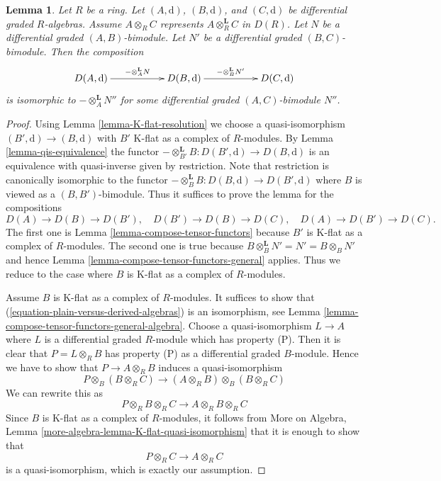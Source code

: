 \documentclass[10pt,a4paper]{amsart}
\theoremstyle{plain}
\newtheorem{lemma}[subsection]{Lemma}
\theoremstyle{definition}
\theoremstyle{remark}
\numberwithin{equation}{subsection}
\begin{document}
\begin{lemma}
\label{lemma-compose-tensor-functors-tor}
Let $R$ be a ring. Let $(A, \text{d})$, $(B, \text{d})$, and
$(C, \text{d})$ be differential graded $R$-algebras. Assume
$A \otimes_R C$ represents $A \otimes^\mathbf{L}_R C$ in $D(R)$.
Let $N$ be a differential graded $(A, B)$-bimodule.
Let $N'$ be a differential graded $(B, C)$-bimodule.
Then the composition
$$
\xymatrix{
D(A, \text{d}) \ar[rr]^{- \otimes_A^\mathbf{L} N} & &
D(B, \text{d}) \ar[rr]^{- \otimes_B^\mathbf{L} N'} & &
D(C, \text{d})
}
$$
is isomorphic to $- \otimes_A^\mathbf{L} N''$ for some differential graded
$(A, C)$-bimodule $N''$.
\end{lemma}

\begin{proof}
Using Lemma \ref{lemma-K-flat-resolution}
we choose a quasi-isomorphism $(B', \text{d}) \to (B, \text{d})$
with $B'$ K-flat as a complex of $R$-modules.
By Lemma \ref{lemma-qis-equivalence}
the functor $-\otimes^\mathbf{L}_{B'} B : D(B', \text{d}) \to D(B, \text{d})$
is an equivalence with quasi-inverse given by restriction.
Note that restriction is canonically isomorphic to the functor
$- \otimes^\mathbf{L}_B B : D(B, \text{d}) \to D(B', \text{d})$
where $B$ is viewed as a $(B, B')$-bimodule.
Thus it suffices to prove the lemma for the compositions
$$
D(A) \to D(B) \to D(B'),\quad
D(B') \to D(B) \to D(C),\quad
D(A) \to D(B') \to D(C).
$$
The first one is Lemma \ref{lemma-compose-tensor-functors}
because $B'$ is K-flat as a complex of $R$-modules.
The second one is true because
$B \otimes_B^\mathbf{L} N' = N' = B \otimes_B N'$
and hence Lemma \ref{lemma-compose-tensor-functors-general} applies.
Thus we reduce to the case where $B$ is K-flat as a complex
of $R$-modules.

\medskip\noindent
Assume $B$ is K-flat as a complex of $R$-modules. It suffices to
show that (\ref{equation-plain-versus-derived-algebras}) is an
isomorphism, see
Lemma \ref{lemma-compose-tensor-functors-general-algebra}.
Choose a quasi-isomorphism $L \to A$ where $L$ is a differential
graded $R$-module which has property (P). Then it is clear that
$P = L \otimes_R B$ has property (P) as a differential graded $B$-module.
Hence we have to show that $P \to A \otimes_R B$
induces a quasi-isomorphism
$$
P \otimes_B (B \otimes_R C)
\longrightarrow
(A \otimes_R B) \otimes_B (B \otimes_R C)
$$
We can rewrite this as
$$
P \otimes_R B \otimes_R C \longrightarrow A \otimes_R B \otimes_R C
$$
Since $B$ is K-flat as a complex of $R$-modules, it
follows from
More on Algebra, Lemma \ref{more-algebra-lemma-K-flat-quasi-isomorphism}
that it is enough
to show that
$$
P \otimes_R C \to A \otimes_R C
$$
is a quasi-isomorphism, which is exactly our assumption.
\end{proof}
\end{document}
